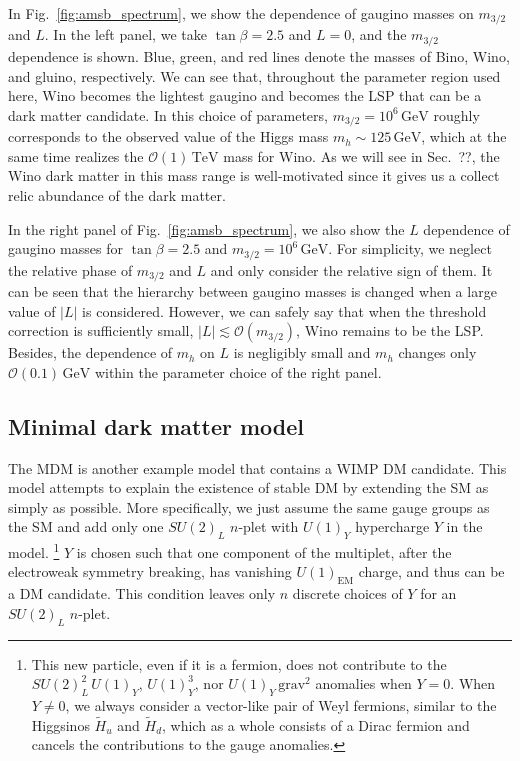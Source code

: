 \documentclass[12pt,twoside,book]{article}
\begin{document}
In Fig.~\ref{fig:amsb_spectrum}, we show the dependence of gaugino masses on $m_{3/2}$ and $L$.
In the left panel, we take $\tan\beta = 2.5$ and $L=0$, and the $m_{3/2}$ dependence is shown.
Blue, green, and red lines denote the masses of Bino, Wino, and gluino, respectively.
We can see that, throughout the parameter region used here, Wino becomes the lightest gaugino and becomes the LSP that can be a dark matter candidate.
In this choice of parameters, $m_{3/2} = 10^6\,\mathrm{GeV}$ roughly corresponds to the observed value of the Higgs mass $m_h \sim 125\,\mathrm{GeV}$, which at the same time realizes the $\mathcal{O}(1)\,\mathrm{TeV}$ mass for Wino.
As we will see in Sec.~??,  the Wino dark matter in this mass range is well-motivated since it gives us a collect relic abundance of the dark matter.

In the right panel of Fig.~\ref{fig:amsb_spectrum}, we also show the $L$ dependence of gaugino masses for $\tan\beta = 2.5$ and $m_{3/2} = 10^6\,\mathrm{GeV}$.
For simplicity, we neglect the relative phase of $m_{3/2}$ and $L$ and only consider the relative sign of them.
It can be seen that the hierarchy between gaugino masses is changed when a large value of $|L|$ is considered.
However, we can safely say that when the threshold correction is sufficiently small, $|L| \lesssim \mathcal{O}(m_{3/2})$, Wino remains to be the LSP.
Besides, the dependence of $m_h$ on $L$ is negligibly small and $m_h$ changes only $\mathcal{O} (0.1)\,\mathrm{GeV}$ within the parameter choice of the right panel.


\subsection{Minimal dark matter model}
\label{sec:MDM}

The MDM \cite{Cirelli:2005uq, Cirelli:2007xd, Cirelli:2009uv} is another example model that contains a WIMP DM candidate.
This model attempts to explain the existence of stable DM by extending the SM as simply as possible.
More specifically, we just assume the same gauge groups as the SM and add only one $SU(2)_L$ $n$-plet with $U(1)_Y$ hypercharge $Y$ in the model.
\footnote{
  This new particle, even if it is a fermion, does not contribute to the $SU(2)_L^2\, U(1)_Y$, $U(1)_Y^3$, nor $U(1)_Y\,\text{grav}^2$ anomalies when $Y=0$.
  When $Y \neq 0$, we always consider a vector-like pair of Weyl fermions, similar to the Higgsinos $\tilde{H}_u$ and $\tilde{H}_d$, which as a whole consists of a Dirac fermion and cancels the contributions to the gauge anomalies.
}
$Y$ is chosen such that one component of the multiplet, after the electroweak symmetry breaking, has vanishing $U(1)_{\mathrm{EM}}$ charge, and thus can be a DM candidate.
This condition leaves only $n$ discrete choices of $Y$ for an $SU(2)_L$ $n$-plet.
\end{document}
